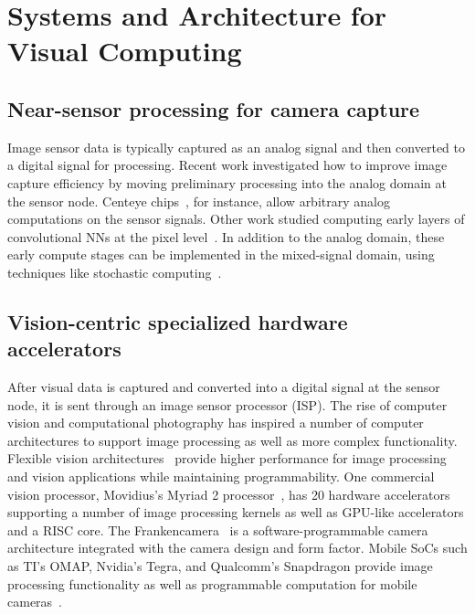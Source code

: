 \section{Systems and Architecture for Visual Computing}

\subsection{Near-sensor processing for camera capture}
\label{sec:related:camera}

Image sensor data is typically captured as an analog signal and then converted to a digital signal for processing.
Recent work investigated how to improve image capture efficiency by moving preliminary processing into the analog domain at the sensor node.
Centeye chips~\cite{Centeye}, for instance, allow arbitrary analog computations on the sensor signals.
Other work studied computing early layers of convolutional NNs at the pixel level~\cite{Chen_2016_ASPVision, redeye, conv-sens09}.
In addition to the analog domain, these early compute stages can be implemented in the mixed-signal domain, using techniques like stochastic computing~\cite{stoch-edge-sensor14, Alaghi13}.

\subsection{Vision-centric specialized hardware accelerators}
\label{sec:related:vision-hw}

After visual data is captured and converted into a digital signal at the sensor node, it is sent through an image sensor processor (ISP).
The rise of computer vision and computational photography has inspired a number of computer architectures to support image processing as well as more complex functionality.
Flexible vision architectures~\cite{convolution_engine, clemons_eva, clemons_pmem, hpca_visionsys, vasilyev_2016} provide higher performance for image processing and vision applications while maintaining programmability.
One commercial vision processor, Movidius's Myriad 2 processor~\cite{myriad15}, has 20 hardware accelerators supporting a number of image processing kernels as well as GPU-like accelerators and a RISC core.
The Frankencamera~\cite{adams2010frankencamera} is a software-programmable camera architecture integrated with the camera design and form factor.
Mobile SoCs such as TI's OMAP, Nvidia's Tegra, and Qualcomm's Snapdragon provide image processing functionality as well as programmable computation for mobile cameras~\cite{omap,tegra,snapdragon}.

